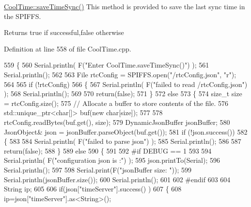 \hyperlink{class_cool_time_ae9658c9b377510d469e3b88edf33ee85}{Cool\+Time\+::save\+Time\+Sync()} This method is provided to save the last sync time in the S\+P\+I\+F\+FS.

\begin{DoxyReturn}{Returns}
true if successful,false otherwise 
\end{DoxyReturn}


Definition at line 558 of file Cool\+Time.\+cpp.


\begin{DoxyCode}
559 \{
560     Serial.println( F(\textcolor{stringliteral}{"Enter CoolTime.saveTimeSync()"}) );
561     Serial.println();
562 
563     File rtcConfig = SPIFFS.open(\textcolor{stringliteral}{"/rtcConfig.json"}, \textcolor{stringliteral}{"r"});
564 
565     \textcolor{keywordflow}{if} (!rtcConfig) 
566     \{
567         Serial.println( F(\textcolor{stringliteral}{"failed to read /rtcConfig.json"}) );
568         Serial.println();
569 
570         \textcolor{keywordflow}{return}(\textcolor{keyword}{false});
571     \}
572     \textcolor{keywordflow}{else}
573     \{
574         \textcolor{keywordtype}{size\_t} size = rtcConfig.size();
575         \textcolor{comment}{// Allocate a buffer to store contents of the file.}
576         std::unique\_ptr<char[]> buf(\textcolor{keyword}{new} \textcolor{keywordtype}{char}[size]);
577 
578         rtcConfig.readBytes(buf.get(), size);
579         DynamicJsonBuffer jsonBuffer;
580         JsonObject& json = jsonBuffer.parseObject(buf.get());
581         \textcolor{keywordflow}{if} (!json.success()) 
582         \{
583 
584             Serial.println( F(\textcolor{stringliteral}{"failed to parse json"}) );
585             Serial.println();
586 
587             \textcolor{keywordflow}{return}(\textcolor{keyword}{false});
588         \} 
589         \textcolor{keywordflow}{else}
590         \{
591 
592 \textcolor{preprocessor}{        #if DEBUG == 1}
593     
594             Serial.println( F(\textcolor{stringliteral}{"configuration json is :"}) );
595             json.printTo(Serial);
596             Serial.println();
597 
598             Serial.print(F(\textcolor{stringliteral}{"jsonBuffer size: "}));
599             Serial.println(jsonBuffer.size());
600             Serial.println();
601 
602 \textcolor{preprocessor}{        #endif}
603 
604             String ip;
605                     
606             \textcolor{keywordflow}{if}(json[\textcolor{stringliteral}{"timeServer"}].success() )
607             \{           
608                  ip=json[\textcolor{stringliteral}{"timeServer"}].as<String>();

\end{DoxyCode}
